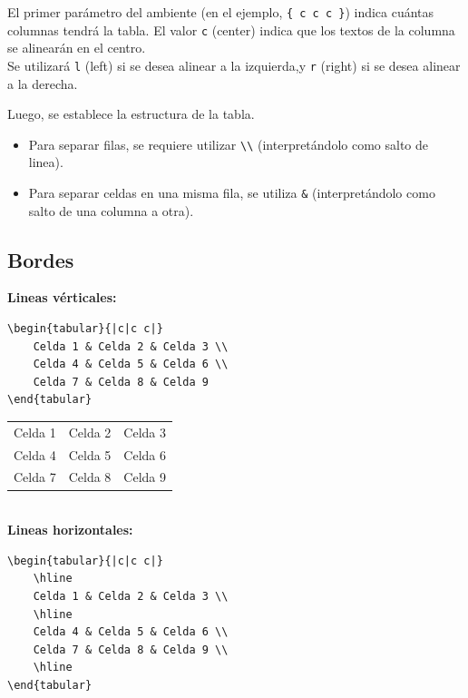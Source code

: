 \documentclass[../notes.tex]{subfiles}
\begin{document}
        El primer parámetro del ambiente (en el ejemplo, \texttt{\{ c c c \}}) indica cuántas columnas tendrá la tabla. El valor \texttt{c} (center) indica que los textos de la columna se alinearán en el centro.\\[\baselineskip]

        Se utilizará \texttt{l} (left) si se desea alinear a la izquierda,y \texttt{r} (right) si se desea alinear a la derecha.

        Luego, se establece la estructura de la tabla.
            \begin{itemize}
                \item Para separar filas, se requiere utilizar \texttt{\textbackslash \textbackslash} (interpretándolo como salto de linea).
                \item Para separar celdas en una misma fila, se utiliza \texttt{\&} (interpretándolo como salto de una columna a otra).
            \end{itemize}

    \subsection{Bordes}
    
        \textbf{Lineas vérticales:}         
            \begin{verbatim}
\begin{tabular}{|c|c c|}
    Celda 1 & Celda 2 & Celda 3 \\ 
    Celda 4 & Celda 5 & Celda 6 \\  
    Celda 7 & Celda 8 & Celda 9    
\end{tabular}
            \end{verbatim}
            
\begin{tabular}{|c|c c|}
    Celda 1 & Celda 2 & Celda 3 \\ 
    Celda 4 & Celda 5 & Celda 6 \\  
    Celda 7 & Celda 8 & Celda 9    
\end{tabular}\\[\baselineskip]

        \textbf{Lineas horizontales:}         
            \begin{verbatim}
\begin{tabular}{|c|c c|}
    \hline
    Celda 1 & Celda 2 & Celda 3 \\
    \hline
    Celda 4 & Celda 5 & Celda 6 \\  
    Celda 7 & Celda 8 & Celda 9 \\
    \hline
\end{tabular}
            \end{verbatim}
            
\end{document}
